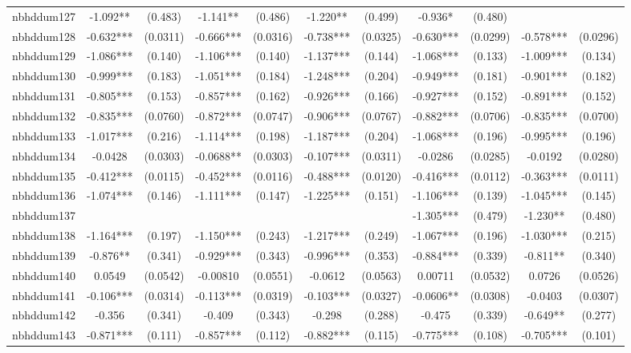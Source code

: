 \documentclass[]{article}
\begin{document}
\begin{tabular}{lcccccccccc}
nbhddum127 & -1.092** & (0.483) & -1.141** & (0.486) & -1.220** & (0.499) & -0.936* & (0.480) &  &  \\
nbhddum128 & -0.632*** & (0.0311) & -0.666*** & (0.0316) & -0.738*** & (0.0325) & -0.630*** & (0.0299) & -0.578*** & (0.0296) \\
nbhddum129 & -1.086*** & (0.140) & -1.106*** & (0.140) & -1.137*** & (0.144) & -1.068*** & (0.133) & -1.009*** & (0.134) \\
nbhddum130 & -0.999*** & (0.183) & -1.051*** & (0.184) & -1.248*** & (0.204) & -0.949*** & (0.181) & -0.901*** & (0.182) \\
nbhddum131 & -0.805*** & (0.153) & -0.857*** & (0.162) & -0.926*** & (0.166) & -0.927*** & (0.152) & -0.891*** & (0.152) \\
nbhddum132 & -0.835*** & (0.0760) & -0.872*** & (0.0747) & -0.906*** & (0.0767) & -0.882*** & (0.0706) & -0.835*** & (0.0700) \\
nbhddum133 & -1.017*** & (0.216) & -1.114*** & (0.198) & -1.187*** & (0.204) & -1.068*** & (0.196) & -0.995*** & (0.196) \\
nbhddum134 & -0.0428 & (0.0303) & -0.0688** & (0.0303) & -0.107*** & (0.0311) & -0.0286 & (0.0285) & -0.0192 & (0.0280) \\
nbhddum135 & -0.412*** & (0.0115) & -0.452*** & (0.0116) & -0.488*** & (0.0120) & -0.416*** & (0.0112) & -0.363*** & (0.0111) \\
nbhddum136 & -1.074*** & (0.146) & -1.111*** & (0.147) & -1.225*** & (0.151) & -1.106*** & (0.139) & -1.045*** & (0.145) \\
nbhddum137 &  &  &  &  &  &  & -1.305*** & (0.479) & -1.230** & (0.480) \\
nbhddum138 & -1.164*** & (0.197) & -1.150*** & (0.243) & -1.217*** & (0.249) & -1.067*** & (0.196) & -1.030*** & (0.215) \\
nbhddum139 & -0.876** & (0.341) & -0.929*** & (0.343) & -0.996*** & (0.353) & -0.884*** & (0.339) & -0.811** & (0.340) \\
nbhddum140 & 0.0549 & (0.0542) & -0.00810 & (0.0551) & -0.0612 & (0.0563) & 0.00711 & (0.0532) & 0.0726 & (0.0526) \\
nbhddum141 & -0.106*** & (0.0314) & -0.113*** & (0.0319) & -0.103*** & (0.0327) & -0.0606** & (0.0308) & -0.0403 & (0.0307) \\
nbhddum142 & -0.356 & (0.341) & -0.409 & (0.343) & -0.298 & (0.288) & -0.475 & (0.339) & -0.649** & (0.277) \\
nbhddum143 & -0.871*** & (0.111) & -0.857*** & (0.112) & -0.882*** & (0.115) & -0.775*** & (0.108) & -0.705*** & (0.101) \\

\end{tabular}
\end{document}
